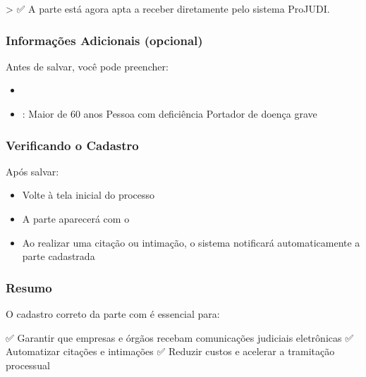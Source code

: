 \documentclass[letterpaper,10pt,brazil]{sphinxmanual}
\begin{document}
\sphinxAtStartPar
\textgreater{} ✅ A parte está agora apta a receber  diretamente pelo sistema ProJUDI.


\subsubsection{Informações Adicionais (opcional)}
\label{\detokenize{projud_24_cadastropartecitacaoonline:informacoes-adicionais-opcional}}
\sphinxAtStartPar
Antes de salvar, você pode preencher:
\begin{itemize}
\item {} 
\sphinxAtStartPar
{}

\item {} 
\sphinxAtStartPar
{}:
\sphinxhyphen{} Maior de 60 anos
\sphinxhyphen{} Pessoa com deficiência
\sphinxhyphen{} Portador de doença grave

\end{itemize}


\subsubsection{Verificando o Cadastro}
\label{\detokenize{projud_24_cadastropartecitacaoonline:verificando-o-cadastro}}
\sphinxAtStartPar
Após salvar:
\begin{itemize}
\item {} 
\sphinxAtStartPar
Volte à tela inicial do processo

\item {} 
\sphinxAtStartPar
A parte aparecerá com o 

\item {} 
\sphinxAtStartPar
Ao realizar uma citação ou intimação, o sistema notificará automaticamente a parte cadastrada

\end{itemize}


\subsubsection{Resumo}
\label{\detokenize{projud_24_cadastropartecitacaoonline:resumo}}
\sphinxAtStartPar
O cadastro correto da parte com  é essencial para:

\sphinxAtStartPar
✅ Garantir que empresas e órgãos recebam comunicações judiciais eletrônicas
✅ Automatizar citações e intimações
✅ Reduzir custos e acelerar a tramitação processual
\end{document}
